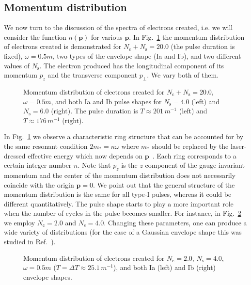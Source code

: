 \documentclass[preprint,aps,prd,showpacs,floatfix]{revtex4-1}
\begin{document}
\subsection{Momentum distribution}\label{subsec:I_mom}
We now turn to the discussion of the spectra of electrons created, i.e. we will consider the function $n(\boldsymbol{p})$ for various $\boldsymbol{p}$. In Fig.~\ref{fig:I_mom} the momentum distribution of electrons created is demonstrated for $N_\text{c} + N_\text{s} = 20.0$ (the pulse duration is fixed), $\omega = 0.5m$, two types of the envelope shape (Ia and Ib), and two different values of $N_\text{s}$. The electron produced has the longitudinal component of its momentum $p_z$ and the transverse component $p_\perp$. We vary both of them.
%
\begin{figure}[h]
\caption{Momentum distribution of electrons created for $N_\text{c} + N_\text{s} = 20.0$, $\omega = 0.5m$, and both Ia and Ib pulse shapes for $N_\text{s} = 4.0$ (left) and $N_\text{s} = 6.0$ (right). The pulse duration is $T \approx 201 \, m^{-1}$ (left) and $T \approx 176 \, m^{-1}$ (right).}
\label{fig:I_mom}
\end{figure}
%
In Fig.~\ref{fig:I_mom} we observe a characteristic ring structure that can be accounted for by the same resonant condition $2m_* = n\omega$ where $m_*$ should be replaced by the laser-dressed effective energy which now depends on $\boldsymbol{p}$~\cite{mocken_pra_2010}. Each ring corresponds to a certain integer number $n$. Note that $p_z$ is the $z$ component of the gauge invariant momentum and the center of the momentum distribution does not necessarily coincide with the origin $\boldsymbol{p}=0$. We point out that the general structure of the momentum distribution is the same for all type-I pulses, whereas it could be different quantitatively. The pulse shape starts to play a more important role when the number of cycles in the pulse becomes smaller. For instance, in Fig.~\ref{fig:I_mom_short} we employ $N_\text{c} = 2.0$ and $N_\text{s} = 4.0$. Changing these parameters, one can produce a wide variety of distributions (for the case of a Gaussian envelope shape this was studied in Ref.~\cite{hebenstreit_prl_2009}).
%
\begin{figure}[h]
\caption{Momentum distribution of electrons created for $N_\text{c} = 2.0$, $N_\text{s} = 4.0$, $\omega = 0.5m$ ($T = \Delta T \approx 25.1 \, m^{-1}$), and both Ia (left) and Ib (right) envelope shapes.}
\label{fig:I_mom_short}
\end{figure}
%
\end{document}
